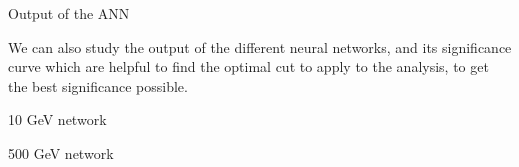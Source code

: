 \documentclass[8 pt]{beamer}
\begin{document}
\begin{frame}{Output of the ANN}

\justifying
We can also study the output of the different neural networks, and its significance curve which are helpful to find the optimal cut to apply to the analysis, to get the best significance possible. \vfill

   \begin{minipage}[c]{.48\linewidth}
       \begin{exampleblock}{} { \begin{center} 10 GeV network \end{center}} \end{exampleblock} \vspace{2pt}
   \end{minipage} \hfill
   \hspace{4pt}
   \begin{minipage}[c]{.48\linewidth}
   	\begin{exampleblock}{} {\begin{center} 500 GeV network \end{center}} \end{exampleblock} \vspace{2pt}
\end{minipage}
\end{frame}
\end{document}
